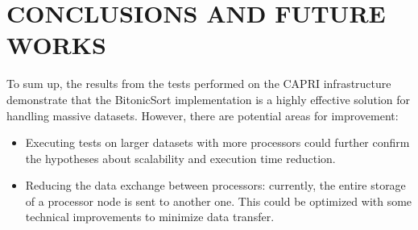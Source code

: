 \documentclass[article,12pt,conference]{ieeeconf} %
\begin{document}
\section{CONCLUSIONS AND FUTURE WORKS}
To sum up, the results from the tests performed on the CAPRI infrastructure demonstrate that the BitonicSort implementation is a highly effective solution for handling massive datasets. However, there are potential areas for improvement:
\begin{itemize}
    \item Executing tests on larger datasets with more processors could further confirm the hypotheses about scalability and execution time reduction.
    \item Reducing the data exchange between processors: currently, the entire storage of a processor node is sent to another one. This could be optimized with some technical improvements to minimize data transfer.
\end{itemize}

\addtolength{\textheight}{-12cm}   %


\printbibliography[nottype=online]
\end{document}
